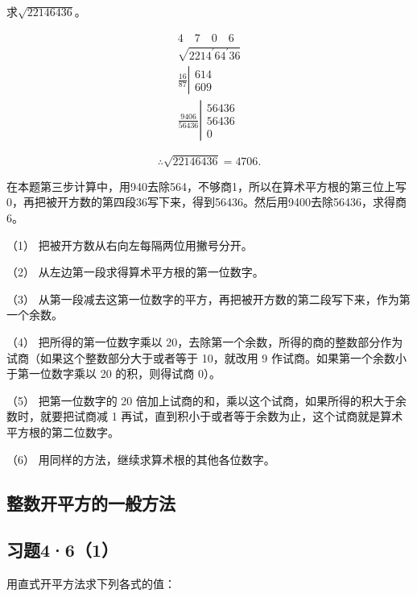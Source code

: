 求\(\sqrt{22146436}\)。


\[
\begin{array}{r} 4 \quad 7 \quad 0 \quad 6 \\ \sqrt {2214 ^ {\prime} 64 ^ {\prime} 36} \\ \frac{16}{87} \left| \begin{array}{c} 614 \\ 609 \end{array} \right. \\ \frac{9406}{56436} \left| \begin{array}{c} 56436 \\ 56436 \\ 0 \end{array} \right. \end{array}
\]

\[
\therefore \sqrt {22146436} = 4706.
\]

在本题第三步计算中，用940去除564，不够商1，所以在算术平方根的第三位上写0，再把被开方数的第四段36写下来，得到56436。然后用9400去除56436，求得商6。

（1） 把被开方数从右向左每隔两位用撇号分开。

（2） 从左边第一段求得算术平方根的第一位数字。

（3）
从第一段减去这第一位数字的平方，再把被开方数的第二段写下来，作为第一个余数。

（4） 把所得的第一位数字乘以
20，去除第一个余数，所得的商的整数部分作为试商（如果这个整数部分大于或者等于
10，就改用 9 作试商。如果第一个余数小于第一位数字乘以 20 的积，则得试商
0）。

（5） 把第一位数字的 20
倍加上试商的和，乘以这个试商，如果所得的积大于余数时，就要把试商减 1
再试，直到积小于或者等于余数为止，这个试商就是算术平方根的第二位数字。

（6） 用同样的方法，继续求算术根的其他各位数字。

\subsection{整数开平方的一般方法}

\subsection{习题4·6（1）}

用直式开平方法求下列各式的值：

